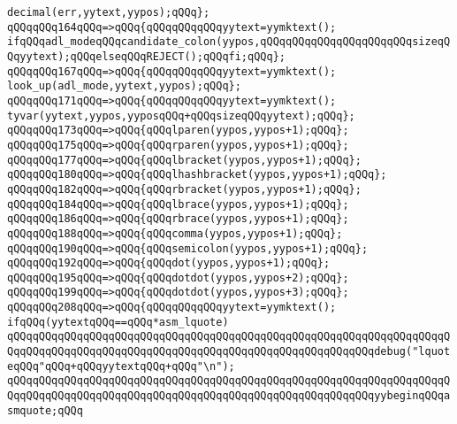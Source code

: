 \verb|decimal(err,yytext,yypos);qQQq};|\newline
\verb|qQQqqQQq164qQQq=>qQQq{qQQqqQQqqQQqyytext=yymktext();|\newline
\verb|ifqQQqadl_modeqQQqcandidate_colon(yypos,qQQqqQQqqQQqqQQqqQQqqQQqsizeqQQqyytext);qQQqelseqQQqREJECT();qQQqfi;qQQq};|\newline
\verb|qQQqqQQq167qQQq=>qQQq{qQQqqQQqqQQqyytext=yymktext();|\newline
\verb|look_up(adl_mode,yytext,yypos);qQQq};|\newline
\verb|qQQqqQQq171qQQq=>qQQq{qQQqqQQqqQQqyytext=yymktext();|\newline
\verb|tyvar(yytext,yypos,yyposqQQq+qQQqsizeqQQqyytext);qQQq};|\newline
\verb|qQQqqQQq173qQQq=>qQQq{qQQqlparen(yypos,yypos+1);qQQq};|\newline
\verb|qQQqqQQq175qQQq=>qQQq{qQQqrparen(yypos,yypos+1);qQQq};|\newline
\verb|qQQqqQQq177qQQq=>qQQq{qQQqlbracket(yypos,yypos+1);qQQq};|\newline
\verb|qQQqqQQq180qQQq=>qQQq{qQQqlhashbracket(yypos,yypos+1);qQQq};|\newline
\verb|qQQqqQQq182qQQq=>qQQq{qQQqrbracket(yypos,yypos+1);qQQq};|\newline
\verb|qQQqqQQq184qQQq=>qQQq{qQQqlbrace(yypos,yypos+1);qQQq};|\newline
\verb|qQQqqQQq186qQQq=>qQQq{qQQqrbrace(yypos,yypos+1);qQQq};|\newline
\verb|qQQqqQQq188qQQq=>qQQq{qQQqcomma(yypos,yypos+1);qQQq};|\newline
\verb|qQQqqQQq190qQQq=>qQQq{qQQqsemicolon(yypos,yypos+1);qQQq};|\newline
\verb|qQQqqQQq192qQQq=>qQQq{qQQqdot(yypos,yypos+1);qQQq};|\newline
\verb|qQQqqQQq195qQQq=>qQQq{qQQqdotdot(yypos,yypos+2);qQQq};|\newline
\verb|qQQqqQQq199qQQq=>qQQq{qQQqdotdot(yypos,yypos+3);qQQq};|\newline
\verb|qQQqqQQq208qQQq=>qQQq{qQQqqQQqqQQqyytext=yymktext();|\newline
\verb|ifqQQq(yytextqQQq==qQQq*asm_lquote)|\newline
\verb|qQQqqQQqqQQqqQQqqQQqqQQqqQQqqQQqqQQqqQQqqQQqqQQqqQQqqQQqqQQqqQQqqQQqqQQqqQQqqQQqqQQqqQQqqQQqqQQqqQQqqQQqqQQqqQQqqQQqqQQqqQQqqQQqdebug("lquoteqQQq"qQQq+qQQqyytextqQQq+qQQq"\n");|\newline
\verb|qQQqqQQqqQQqqQQqqQQqqQQqqQQqqQQqqQQqqQQqqQQqqQQqqQQqqQQqqQQqqQQqqQQqqQQqqQQqqQQqqQQqqQQqqQQqqQQqqQQqqQQqqQQqqQQqqQQqqQQqqQQqqQQqyybeginqQQqasmquote;qQQq|\newline
